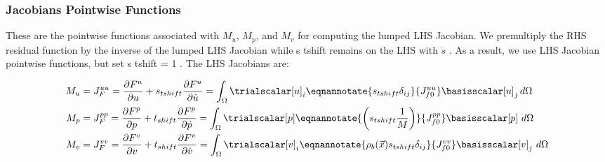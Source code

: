 \subsubsection{Jacobians Pointwise Functions}

These are the pointwise functions associated with $M_{u}$, $M_{p}$, and $M_{v}$ for computing the lumped LHS Jacobian. We premultiply the
RHS residual function by the inverse of the lumped LHS Jacobian while s tshift remains on the LHS with $\dot{s}$ . As a result, we use
LHS Jacobian pointwise functions, but set s tshift = 1 . The LHS Jacobians are:

\begin{align}
M_{u} &= J_F^{uu} = \frac{\partial F^u}{\partial u} + s_{tshift} \frac{\partial F^u}{\partial \dot{u}} =
\int_{\Omega} \trialscalar[u]_{i} \eqnannotate{s_{tshift} \delta_{ij}}{J^{uu}_{f0}} \basisscalar[u]_{j} \, d \Omega \\
M_{p} &= J_F^{pp} = \frac{\partial F^p}{\partial p} + t_{shift} \frac{\partial F^p}{\partial \dot{p}} =
\int_{\Omega} \trialscalar[p] \eqnannotate{\left(s_{tshift} \frac{1}{M}\right)}{J_{f0}^{pp}} \basisscalar[p] \ d\Omega \\
M_{v} &= J_F^{vv} = \frac{\partial F^v}{\partial v} + t_{shift} \frac{\partial F^v}{\partial \dot{v}} =
\int_{\Omega} \trialscalar[v]_{i}\eqnannotate{\rho_{b}(\vec{x}) s_{tshift} \delta_{ij}}{J^{vv}_{f0}} \basisscalar[v]_{j} \  d \Omega
\end{align}
